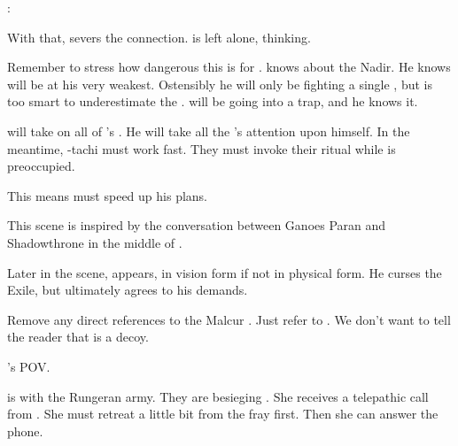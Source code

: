 \Ishnaruchaefir: 

With that, \Ishnaruchaefir severs the connection. 
\Psyrex is left alone, thinking. 

Remember to stress how dangerous this is for \Ishnaruchaefir.
\Psyrex knows about the Nadir. 
He knows \Ishnaruchaefir will be at his very weakest. 
Ostensibly he will only be fighting a single \resphan, but \Psyrex is too smart to underestimate the \resphain.
\Ishnaruchaefir will be going into a trap, and he knows it. 

\Ishnaruchaefir will take on all of \Teshrial's \noggyaleth.
He will take all the \resphain's attention upon himself. 
In the meantime, \Psyrex-tachi must work fast. 
They must invoke their ritual while \Teshrial is preoccupied. 

This means \Psyrex{} must speed up his plans. 

This scene is inspired by the conversation between Ganoes Paran and Shadowthrone in the middle of \cite{StevenErikson:TheBonehunters}. 

Later in the scene, \Secherdamon appears, in vision form if not in physical form. 
He curses the Exile, but ultimately agrees to his demands. 

Remove any direct references to the Malcur \nexus. 
Just refer to . 
We don't want to tell the reader that \Forclin{} is a decoy. 





\begin{comment}
  \section{\Takestsha}
\end{comment}

\begin{comment}
  \subsection{Psyrex contacts Takestsha}
\end{comment}

\Takestsha's POV. 

\Takestsha is with the Rungeran army.
They are besieging \Forclin.
She receives a telepathic call from \Psyrex.
She must retreat a little bit from the fray first.
Then she can answer the phone.

